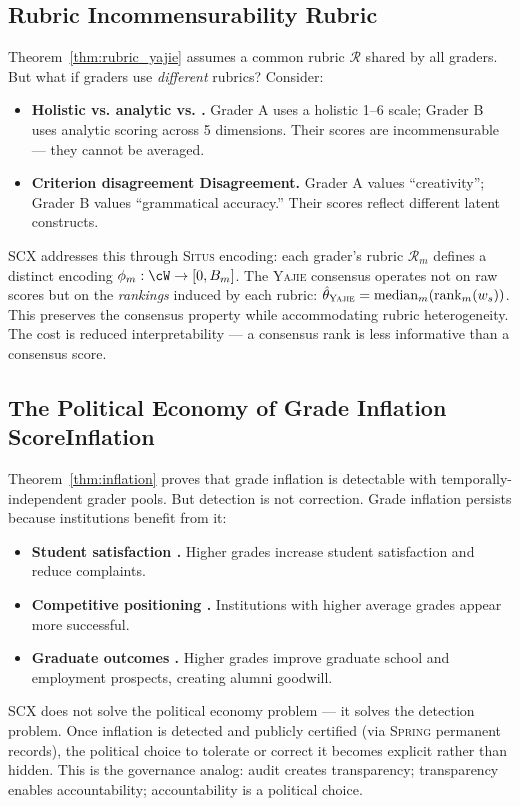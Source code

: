 \documentclass[11pt,a4paper]{article}
\theoremstyle{definition}
\theoremstyle{remark}
\newcommand{\SCX}{\textsc{SCX}}
\newcommand{\Situs}{\textsc{Situs}}
\newcommand{\Yajie}{\textsc{Yajie}}
\newcommand{\Spring}{\textsc{Spring}}
\newcommand{\cR}{\mathcal{R}}
\newcommand{\rubric}{\cR}
\begin{document}
\subsection{Rubric Incommensurability Rubric}
Theorem~\ref{thm:rubric_yajie} assumes a common rubric $\rubric$ shared by all graders. But what if graders use \textit{different} rubrics? Consider:
\begin{itemize}[nosep]
    \item \textbf{Holistic vs. analytic  vs. .} Grader A uses a holistic 1--6 scale; Grader B uses analytic scoring across 5 dimensions. Their scores are incommensurable — they cannot be averaged.
    \item \textbf{Criterion disagreement Disagreement.} Grader A values ``creativity''; Grader B values ``grammatical accuracy.'' Their scores reflect different latent constructs.
\end{itemize}
\SCX{} addresses this through \Situs{} encoding: each grader's rubric $\rubric_m$ defines a distinct encoding $\phi_m: \cW \to [0, B_m]$. The \Yajie{} consensus operates not on raw scores but on the \textit{rankings} induced by each rubric: $\hat{\theta}_{\Yajie} = \text{median}_m(\text{rank}_m(w_s))$. This preserves the consensus property while accommodating rubric heterogeneity. The cost is reduced interpretability — a consensus rank is less informative than a consensus score.
\subsection{The Political Economy of Grade Inflation ScoreInflation}
Theorem~\ref{thm:inflation} proves that grade inflation is detectable with temporally-independent grader pools. But detection is not correction. Grade inflation persists because institutions benefit from it:
\begin{itemize}[nosep]
    \item \textbf{Student satisfaction .} Higher grades increase student satisfaction and reduce complaints.
    \item \textbf{Competitive positioning .} Institutions with higher average grades appear more successful.
    \item \textbf{Graduate outcomes .} Higher grades improve graduate school and employment prospects, creating alumni goodwill.
\end{itemize}
\SCX{} does not solve the political economy problem — it solves the detection problem. Once inflation is detected and publicly certified (via \Spring{} permanent records), the political choice to tolerate or correct it becomes explicit rather than hidden. This is the governance analog: audit creates transparency; transparency enables accountability; accountability is a political choice.
\end{document}

